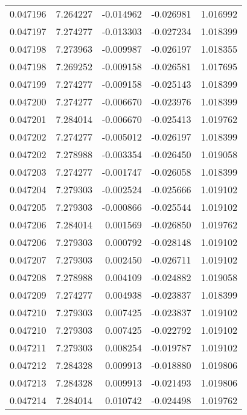 \begin{tabular}{lrrrr}
0.047196    &  7.264227 & -0.014962 & -0.026981 &             1.016992 \\
0.047197    &  7.274277 & -0.013303 & -0.027234 &             1.018399 \\
0.047198    &  7.273963 & -0.009987 & -0.026197 &             1.018355 \\
0.047198    &  7.269252 & -0.009158 & -0.026581 &             1.017695 \\
0.047199    &  7.274277 & -0.009158 & -0.025143 &             1.018399 \\
0.047200    &  7.274277 & -0.006670 & -0.023976 &             1.018399 \\
0.047201    &  7.284014 & -0.006670 & -0.025413 &             1.019762 \\
0.047202    &  7.274277 & -0.005012 & -0.026197 &             1.018399 \\
0.047202    &  7.278988 & -0.003354 & -0.026450 &             1.019058 \\
0.047203    &  7.274277 & -0.001747 & -0.026058 &             1.018399 \\
0.047204    &  7.279303 & -0.002524 & -0.025666 &             1.019102 \\
0.047205    &  7.279303 & -0.000866 & -0.025544 &             1.019102 \\
0.047206    &  7.284014 &  0.001569 & -0.026850 &             1.019762 \\
0.047206    &  7.279303 &  0.000792 & -0.028148 &             1.019102 \\
0.047207    &  7.279303 &  0.002450 & -0.026711 &             1.019102 \\
0.047208    &  7.278988 &  0.004109 & -0.024882 &             1.019058 \\
0.047209    &  7.274277 &  0.004938 & -0.023837 &             1.018399 \\
0.047210    &  7.279303 &  0.007425 & -0.023837 &             1.019102 \\
0.047210    &  7.279303 &  0.007425 & -0.022792 &             1.019102 \\
0.047211    &  7.279303 &  0.008254 & -0.019787 &             1.019102 \\
0.047212    &  7.284328 &  0.009913 & -0.018880 &             1.019806 \\
0.047213    &  7.284328 &  0.009913 & -0.021493 &             1.019806 \\
0.047214    &  7.284014 &  0.010742 & -0.024498 &             1.019762 \\

\end{tabular}
